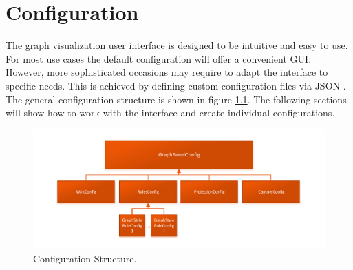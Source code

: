 \chapter{Configuration}
The graph visualization user interface is designed to be intuitive and easy to use. For most use cases the default configuration will offer a convenient GUI. However, more sophisticated occasions may require to adapt the interface to specific needs. This is achieved by defining custom configuration files via JSON \cite{json}. The general configuration structure is shown in figure \ref{fig:configstruct}. The following sections will show how to work with the interface and create individual configurations.

\begin{figure} [h]
\centering
\includegraphics [scale=0.85] {images/configstruct.pdf}
\caption{Configuration Structure.}
\label{fig:configstruct}
\end{figure}



